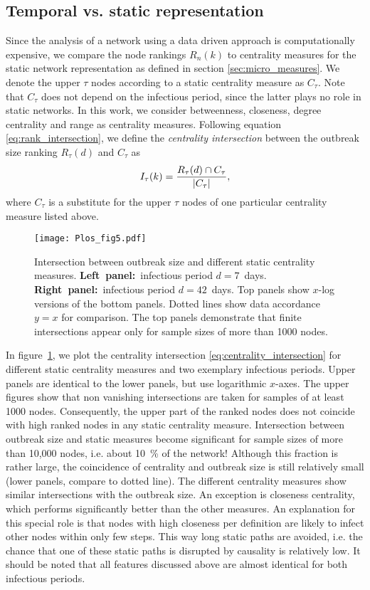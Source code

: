\subsection{Temporal vs. static representation}
Since the analysis of a network using a data driven approach is computationally expensive, we compare the node rankings $R_n(k)$ to centrality measures for the static network representation as defined in section \ref{sec:micro_measures}.
We denote the upper $\tau $ nodes according to a static centrality measure as $C_\tau $.
Note that $C_\tau $ does not depend on the infectious period, since the latter plays no role in static networks.
In this work, we consider betweenness, closeness, degree centrality and range as centrality measures.
Following equation \eqref{eq:rank_intersection}, we define the \emph{centrality intersection} between the outbreak size ranking $R_\tau (d)$ and $C_\tau $ as
\begin{equation}\label{eq:centrality_intersection}
I_\tau (k)=\frac{R_\tau (d) \cap C_\tau}{\left| C_\tau \right|},
\end{equation}
where $C_\tau $ is a substitute for the upper $\tau $ nodes of one particular centrality measure listed above.
%
\begin{figure}[htb]
\begin{center}
\texttt{[image: Plos\_fig5.pdf]}
\caption{Intersection between outbreak size and different static centrality measures.
\textbf{Left~panel:}~infectious period $d=7$~days.
\textbf{Right~panel:}~infectious period $d=42$~days.
Top panels show $x$-log versions of the bottom panels. 
Dotted lines show data accordance $y=x$ for comparison.
The top panels demonstrate that finite intersections appear only for sample sizes of more than 1000 nodes.}
\label{fig:plos_fig5}
\end{center}
\end{figure}

In figure~\ref{fig:plos_fig5}, we plot the centrality intersection \eqref{eq:centrality_intersection} for different static centrality measures and two exemplary infectious periods.
Upper panels are identical to the lower panels, but use logarithmic $x$-axes. 
The upper figures show that non vanishing intersections are taken for samples of at least 1000 nodes.
Consequently, the upper part of the ranked nodes does not coincide with high ranked nodes in any static centrality measure.
Intersection between outbreak size and static measures become significant for sample sizes of more than 10,000 nodes, i.e. about 10~\% of the network!
Although this fraction is rather large, the coincidence of centrality and outbreak size is still relatively small (lower panels, compare to dotted line).
The different centrality measures show similar intersections with the outbreak size.
An exception is closeness centrality, which performs significantly better than the other measures.
An explanation for this special role is that nodes with high closeness per definition are likely to infect other nodes within only few steps.
This way long static paths are avoided, i.e. the chance that one of these static paths is disrupted by causality is relatively low.
It should be noted that all features discussed above are almost identical for both infectious periods.

